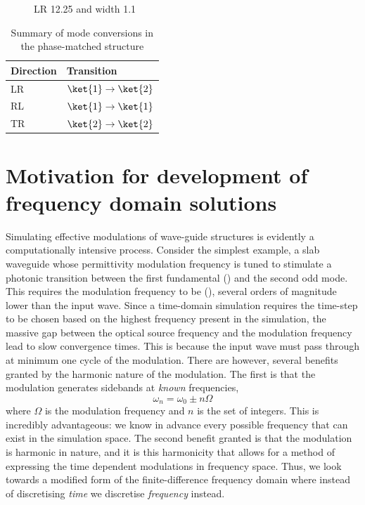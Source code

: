 \begin{figure}[t]
	\centering
	\setlength{\figH}{0.3\textwidth}
	\setlength{\figW}{0.8\textwidth}
	
	\caption[The modulated waveguide structure]{LR 12.25 and width 1.1}
	\label{fig:coherencelength}
\end{figure} 

\begin{table}[]
	\centering
	\caption[Mode conversions in a phase-matched structure]{Summary of mode conversions in the phase-matched structure}
	\label{my-label}
	\begin{tabular}{|l|l|}
		\hline 
		Direction & Transition \\ \hline
		LR        & $\ket{1} \rightarrow \ket{2}$           \\
		RL        & $\ket{1} \rightarrow \ket{1}$           \\
		TR        & $\ket{2} \rightarrow \ket{2}$          \\ \hline
	\end{tabular}
\end{table}

\section{Motivation for development of frequency domain solutions}
	
Simulating effective modulations of wave-guide structures is evidently a computationally intensive process. Consider the simplest example, a slab waveguide whose permittivity modulation frequency is tuned to stimulate a photonic transition between the first fundamental () and the second odd mode. This requires the modulation frequency to be (), several orders of magnitude lower than the input wave. Since a time-domain simulation requires the time-step to be chosen based on the highest frequency present in the simulation, the massive gap between the optical source frequency and the modulation frequency lead to slow convergence times. This is because the input wave must pass through at minimum one cycle of the modulation. There are however, several benefits granted by the harmonic nature of the modulation. The first is that the modulation generates sidebands at \textit{known} frequencies,
\begin{equation}
\omega_n = \omega_0 \pm n \Omega
\end{equation}
where $\Omega$ is the modulation frequency and $n$ is the set of integers. This is incredibly advantageous: we know in advance every possible frequency that can exist in the simulation space. The second benefit granted is that the modulation is harmonic in nature, and it is this harmonicity that allows for a method of expressing the time dependent modulations in frequency space. Thus, we look towards a modified form of the finite-difference frequency domain where instead of discretising \textit{time} we discretise \textit{frequency} instead.



